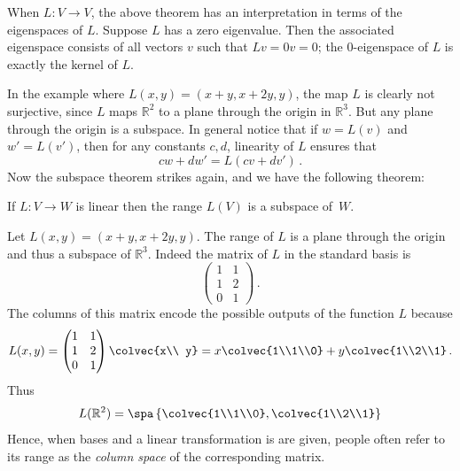 When $L:V\to V$, the above theorem has an interpretation in terms of the eigenspaces of $L$. Suppose $L$ has a zero eigenvalue.  Then the associated eigenspace consists of all vectors $v$ such that $Lv=0v=0$; the $0$-eigenspace of $L$ is exactly the kernel of $L$.  



In the example where $L(x,y)=(x+y,x+2y,y)$, the map $L$ is clearly not surjective, since $L$ maps $\mathbb{R}^2$ to a plane through the origin in $\mathbb{R}^3$. But any plane through the origin is a subspace. In general notice 
that if $w=L(v)$ and $w'=L(v')$, then for any constants $c,d$, linearity of $L$ ensures that \[cw+dw' = L(cv+dv')\, .\]  Now the subspace theorem strikes again, and we have the following theorem:

\begin{theorem}
If $L \colon V\rightarrow W$ is linear then the range $L(V)$ is a subspace of~$W$.
\end{theorem}

\begin{example}
Let $L(x,y)=(x+y,x+2y,y)$. The range of $L$ is a plane through the origin and thus a subspace of ${\mathbb R}^3$.
Indeed the matrix of $L$ in the standard basis is 
\[
\begin{pmatrix}1&1\\1&2\\0&1\end{pmatrix}\, .
\]
The columns of this matrix encode the possible outputs of the function $L$ because
\[
L(x,y)=\begin{pmatrix}1&1\\1&2\\0&1\end{pmatrix}\colvec{x\\ y}=x \colvec{1\\1\\0}+y\colvec{1\\2\\1}\, . 
\]
Thus 
\[
L({\mathbb R}^2)=\spa \left\{\colvec{1\\1\\0},\colvec{1\\2\\1}\right\}
\]
Hence, when  bases and a linear transformation is are given, people often refer to its range as the {\itshape column space}
of the corresponding matrix.
\end{example}

